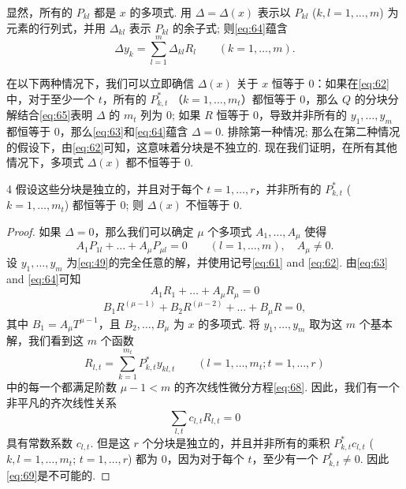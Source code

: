 显然，所有的 $P_{kl}$ 都是 $x$ 的多项式. 用 $\Delta = \Delta(x)$ 表示以 $P_{kl}$ ($k,l=1,\dots,m$) 为元素的行列式，并用 $\Delta_{kl}$ 表示 $P_{kl}$ 的余子式; 则\eqref{eq:64}蕴含
\begin{equation}
\Delta y_{k} = \sum_{l=1}^{m} \Delta_{kl} R_{l} \qquad (k=1,\dots,m). \tag{67}\label{eq:67}
\end{equation}

在以下两种情况下，我们可以立即确信 $\Delta(x)$ 关于 $x$ 恒等于 0：如果在\eqref{eq:62}中，对于至少一个 $t$，所有的 $P_{k,t}^*$ （$k=1,\dots,m_t$）都恒等于 0，那么 $Q$ 的分块分解结合\eqref{eq:65}表明 $\Delta$ 的 $m_t$ 列为 0; 如果 $R$ 恒等于 0，导致并非所有的 $y_1, \dots, y_m$ 都恒等于 0，那么\eqref{eq:63}和\eqref{eq:64}蕴含 $\Delta = 0$. 排除第一种情况; 那么在第二种情况的假设下，由\eqref{eq:62}可知，这意味着分块是不独立的. 现在我们证明，在所有其他情况下，多项式 $\Delta(x)$ 都不恒等于 0.

\begin{mylemma}{}{4}
假设这些分块是独立的，并且对于每个 $t=1,\dots,r$，并非所有的 $P_{k,t}^*$ ($k=1,\dots,m_t$) 都恒等于 0; 则 $\Delta(x)$ 不恒等于 0.
\end{mylemma}

\begin{proof}
如果 $\Delta = 0$，那么我们可以确定 $\mu$ 个多项式 $A_1, \dots, A_{\mu}$ 使得
\[A_1 P_{1l} + \dots + A_{\mu} P_{\mu l} = 0 \qquad (l=1,\dots,m), \quad A_{\mu} \neq 0.\]
设 $y_1, \dots, y_m$ 为\eqref{eq:49}的完全任意的解，并使用记号\eqref{eq:61} and \eqref{eq:62}. 由\eqref{eq:63} and \eqref{eq:64}可知
\[A_1 R_1 + \dots + A_{\mu} R_{\mu} = 0\]
\begin{equation}
B_1 R^{(\mu-1)} + B_2 R^{(\mu-2)} + \dots + B_{\mu} R = 0, \tag{68}\label{eq:68}
\end{equation}
其中 $B_1 = A_{\mu} T^{\mu-1}$，且 $B_2, \dots, B_{\mu}$ 为 $x$ 的多项式. 将 $y_1, \dots, y_m$ 取为这 $m$ 个基本解，我们看到这 $m$ 个函数
\[R_{l,t} = \sum_{k=1}^{m_t} P_{k,t}^* y_{kl,t} \qquad (l=1,\dots,m_t; t=1,\dots,r)\]
中的每一个都满足阶数 $\mu-1 < m$ 的齐次线性微分方程\eqref{eq:68}. 因此，我们有一个非平凡的齐次线性关系
\begin{equation}
\sum_{l,t} c_{l,t} R_{l,t} = 0 \tag{69}\label{eq:69}
\end{equation}
具有常数系数 $c_{l,t}$. 但是这 $r$ 个分块是独立的，并且并非所有的乘积 $P_{k,t}^* c_{l,t}$ ($k,l=1,\dots,m_t$; $t=1,\dots,r$) 都为 0，因为对于每个 $t$，至少有一个 $P_{k,t}^* \neq 0$. 因此\eqref{eq:69}是不可能的.
\end{proof}

